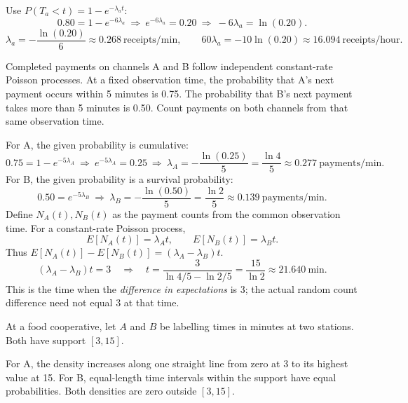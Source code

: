 Use $P(T_a<t)=1-e^{-\lambda_a t}$:
\[0.80=1-e^{-6\lambda_a}\ \Longrightarrow\ e^{-6\lambda_a}=0.20
\ \Longrightarrow\ -6\lambda_a=\ln(0.20).\]
\[\lambda_a=-\frac{\ln(0.20)}6\approx0.268\ \text{receipts/min},\qquad
60\lambda_a=-10\ln(0.20)\approx\boxed{16.094\ \text{receipts/hour}}.\]

Completed payments on channels A and B follow independent constant-rate Poisson processes. At a fixed observation time, the probability that A's next payment occurs within 5 minutes is 0.75. The probability that B's next payment takes more than 5 minutes is 0.50. Count payments on both channels from that same observation time.


For A, the given probability is cumulative:
\[0.75=1-e^{-5\lambda_A}\ \Longrightarrow\ e^{-5\lambda_A}=0.25
\ \Longrightarrow\ \lambda_A=-\frac{\ln(0.25)}5=\frac{\ln4}{5}\approx0.277\ \text{payments/min}.\]
For B, the given probability is a survival probability:
\[0.50=e^{-5\lambda_B}\ \Longrightarrow\ \lambda_B=-\frac{\ln(0.50)}5=\frac{\ln2}{5}\approx0.139\ \text{payments/min}.\]
Define $N_A(t),N_B(t)$ as the payment counts from the common observation time.
For a constant-rate Poisson process,
\[E[N_A(t)]=\lambda_A t,\qquad E[N_B(t)]=\lambda_B t.\]
Thus $E[N_A(t)]-E[N_B(t)]=(\lambda_A-\lambda_B)t$.
\[(\lambda_A-\lambda_B)t=3\quad\Longrightarrow\quad
t=\frac{3}{\ln4/5-\ln2/5}=\boxed{\frac{15}{\ln2}\approx21.640\ \text{min}}.\]
This is the time when the \emph{difference in expectations} is 3; the actual random count difference need not equal 3 at that time.

At a food cooperative, let $A$ and $B$ be labelling times in minutes at two stations. Both have support $[3,15]$.

For A, the density increases along one straight line from zero at 3 to its highest value at 15. For B, equal-length time intervals within the support have equal probabilities. Both densities are zero outside $[3,15]$.

